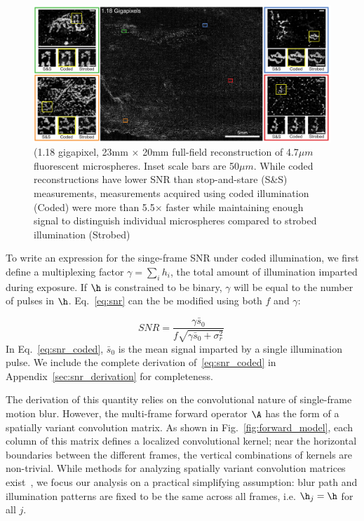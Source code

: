 \begin{figure}
  \centering
    \includegraphics[width=1.0\textwidth]{figures/fig_highthroughput_full_field.pdf}

  \caption{(1.18 gigapixel, 23mm $\times$ 20mm full-field reconstruction of 4.7$\mu m$ fluorescent microspheres. Inset scale bars are 50$\mu m$. While coded reconstructions have lower SNR than stop-and-stare (S\&S) measurements, measurements acquired using coded illumination (Coded) were more than 5.5$\times$ faster while maintaining enough signal to distinguish individual microspheres compared to strobed illumination (Strobed)}

\end{figure}

To write an expression for the singe-frame SNR under coded illumination, we first define a multiplexing factor $\gamma=\sum_{i} h_i$, the total amount of illumination imparted during exposure. If $\h$ is constrained to be binary, $\gamma$ will be equal to the number of pulses in $\h$. Eq.~\ref{eq:snr} can the be modified using both $f$ and $\gamma$:

\begin{equation}
    \label{eq:snr_coded}
    SNR  = \frac{\gamma\bar{s}_0}{f\sqrt{\gamma\bar{s}_0 + \sigma^2_{r}}}\:
\end{equation}
In Eq.~\ref{eq:snr_coded}, $\bar{s}_0$ is the mean signal imparted by a single illumination pulse. We include the complete derivation of~\eqref{eq:snr_coded} in Appendix~\ref{sec:snr_derivation} for completeness.

The derivation of this quantity relies on the convolutional nature of single-frame motion blur.
However, the multi-frame forward operator $\A$ has the form of a spatially variant convolution matrix. As shown in Fig.~\ref{fig:forward_model},
each column of this matrix defines a localized convolutional kernel; near the horizontal boundaries between the different frames, the vertical combinations of kernels are non-trivial.
While methods for analyzing spatially variant convolution matrices exist~\cite{chan2011bounds}, we focus our analysis on a practical simplifying assumption: blur path and illumination patterns are fixed to be the same across all frames, i.e. $\h_j=\h$ for all $j$.

